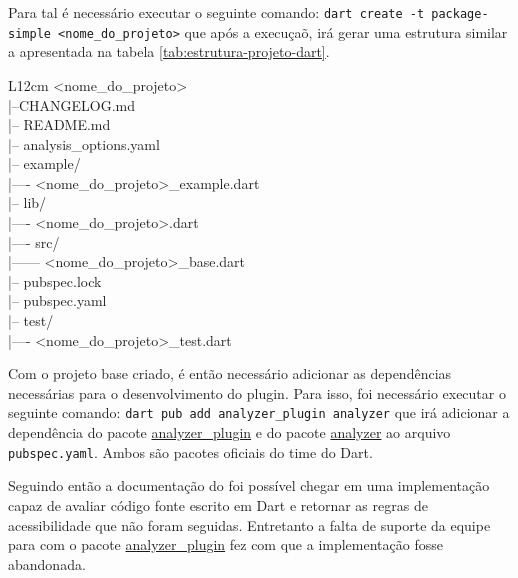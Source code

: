 Para tal é necessário executar o seguinte comando: \texttt{dart create -t package-simple <nome\_do\_projeto>} que após a execuçaõ, irá gerar uma estrutura similar a apresentada na tabela \ref{tab:estrutura-projeto-dart}.

\begin{table}[!htbp]
	\centering
	\renewcommand{\arraystretch}{1.1}
	\caption{Estrutura de um projeto Dart utilizando o template de pacote}
	\label{tab:estrutura-projeto-dart}
	\ttfamily
	\begin{tabular}{ L{12cm} }
		\hline
		<nome\_do\_projeto> \\
		|--CHANGELOG.md \\
		|-- README.md \\
		|-- analysis\_options.yaml \\
		|-- example/ \\
		|---- <nome\_do\_projeto>\_example.dart \\
		|-- lib/ \\
		|---- <nome\_do\_projeto>.dart \\
		|---- src/ \\
		|------ <nome\_do\_projeto>\_base.dart \\
		|-- pubspec.lock \\
		|-- pubspec.yaml \\
		|-- test/ \\
		|---- <nome\_do\_projeto>\_test.dart \\
		\hline
	\end{tabular}
	\fontfamily{\rmdefault}\selectfont
	\vspace{2mm}
\end{table}

Com o projeto base criado, é então necessário adicionar as dependências necessárias para o desenvolvimento do plugin. Para isso, foi necessário executar o seguinte comando: \texttt{dart pub add analyzer\_plugin analyzer} que irá adicionar a dependência do pacote \href{https://pub.dev/packages/analyzer_plugin}{analyzer\_plugin} e do pacote \href{https://pub.dev/packages/analyzer}{analyzer} ao arquivo \texttt{pubspec.yaml}. Ambos são pacotes oficiais do time do Dart.

Seguindo então a documentação do \cite{documentacaoanalyzerplugin} foi possível chegar em uma implementação capaz de avaliar código fonte escrito em Dart e retornar as regras de acessibilidade que não foram seguidas. Entretanto a falta de suporte da equipe para com o pacote \href{https://pub.dev/packages/analyzer_plugin}{analyzer\_plugin} fez com que a implementação fosse abandonada. 

